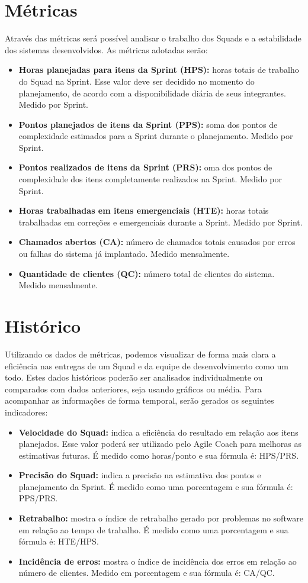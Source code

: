 \documentclass[	DIV=calc,%
							paper=a4,%
							fontsize=12pt,%
							onecolumn]{scrartcl}	 					%
\begin{document}
\section{Métricas}
Através das métricas será possível analisar o trabalho dos Squads e a estabilidade dos sistemas desenvolvidos. As métricas adotadas serão:
\begin{itemize}
	\item \textbf{Horas planejadas para itens da Sprint (HPS):} horas totais de trabalho do Squad na Sprint. Esse valor deve ser decidido no momento do planejamento, de acordo com a disponibilidade diária de seus integrantes. Medido por Sprint.
	\item \textbf{Pontos planejados de itens da Sprint (PPS):} soma dos pontos de complexidade estimados para a Sprint durante o planejamento. Medido por Sprint.
	\item \textbf{Pontos realizados de itens da Sprint (PRS):} oma dos pontos de complexidade dos itens completamente realizados na Sprint. Medido por Sprint. 
	\item \textbf{Horas trabalhadas em itens emergenciais (HTE):} horas totais trabalhadas em correções e emergenciais durante a Sprint. Medido por Sprint.
	\item \textbf{Chamados abertos (CA):} número de chamados totais causados por erros ou falhas do sistema já implantado. Medido mensalmente.
	\item \textbf{Quantidade de clientes (QC):} número total de clientes do sistema. Medido mensalmente.
\end{itemize}	

\section{Histórico}
Utilizando os dados de métricas, podemos visualizar de forma mais clara a eficiência nas entregas de um Squad e da equipe de desenvolvimento como um todo. Estes dados históricos poderão ser analisados individualmente ou comparados com dados anteriores, seja usando gráficos ou média. Para acompanhar as informações de forma temporal, serão gerados os seguintes indicadores:

\begin{itemize}
	\item \textbf{Velocidade do Squad:} indica a eficiência do resultado em relação aos itens planejados. Esse valor poderá ser utilizado pelo Agile Coach para melhoras as estimativas futuras. É medido como horas/ponto e sua fórmula é: HPS/PRS.
	\item \textbf{Precisão do Squad:} indica a precisão na estimativa dos pontos e planejamento da Sprint. É medido como uma porcentagem e sua fórmula é:  PPS/PRS.
	\item \textbf{Retrabalho:} mostra o índice de retrabalho gerado por problemas no software em relação ao tempo de trabalho. É medido como uma porcentagem e sua fórmula é: HTE/HPS.
	\item \textbf{Incidência de erros:} mostra o índice de incidência dos erros em relação ao número de clientes. Medido em porcentagem e sua fórmula é: CA/QC.
\end{itemize}
\end{document}
